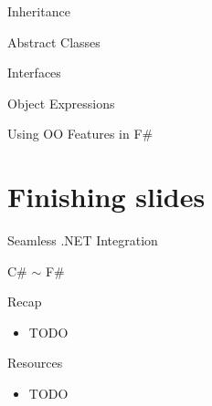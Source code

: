 \documentclass{beamer}
\begin{document}
\begin{frame}{Inheritance}
\end{frame}

\begin{frame}{Abstract Classes}
\end{frame}

\begin{frame}{Interfaces}
\end{frame}

\begin{frame}{Object Expressions}
\end{frame}

\begin{frame}{Using OO Features in F\#}
\end{frame}

\section{Finishing slides}
\frame{\tableofcontents[currentsection]}

\begin{frame}{Seamless .NET Integration}
\end{frame}

\begin{frame}{C\# $\sim$ F\#}
\end{frame}

\begin{frame}{Recap}
  \begin{itemize}[<+->]
    \item TODO
  \end{itemize}
\end{frame}

\begin{frame}{Resources}
  \begin{itemize}
    \item TODO
  \end{itemize}
\end{frame}
\end{document}
